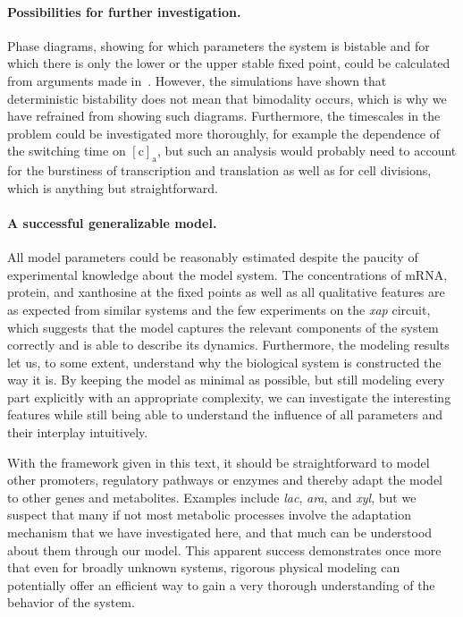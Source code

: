 \documentclass[10pt,letterpaper]{article}
\newcommand{\n}[1]{\mathrm{#1}}
\begin{document}
	\paragraph*{Possibilities for further investigation.}
	Phase diagrams, showing for which parameters the system is bistable and for
	which there is only the lower or the upper stable fixed point, could be
	calculated from arguments made in~\cite{Cherry2000}. However, the
	simulations have shown that deterministic bistability does not mean that
	bimodality occurs, which is why we have refrained from showing such
	diagrams. Furthermore, the timescales in the problem could be investigated
	more thoroughly, for example the dependence of the switching time on
	$\n{[c]_a}$, but such an analysis would probably need to
	account for the burstiness of transcription and translation as well as for
	cell divisions, which is anything but straightforward.
	
	\paragraph*{A successful generalizable model.}
	All model parameters could be reasonably estimated despite the paucity of
	experimental knowledge about the model system. The concentrations of mRNA, protein, and xanthosine at the fixed points as well as all qualitative features are as expected from similar systems and the few experiments on the \emph{xap} circuit, which suggests that the model captures the relevant components of the system correctly and is able to describe its
	dynamics. Furthermore, the modeling results let us, to some extent, understand why the biological system is constructed the way it is. By keeping the model as minimal as possible, but still modeling every part explicitly with an appropriate complexity, we can investigate the interesting features while still being able to understand the influence of all parameters and their interplay intuitively.
	
	With the framework given in this text, it
	should be straightforward to model other promoters, regulatory pathways or
	enzymes and thereby adapt the model to other genes and metabolites. Examples
	include \emph{lac}, \emph{ara}, and \emph{xyl}, but we suspect that many if
	not most metabolic processes involve the adaptation mechanism that we have
	investigated here, and that much can be understood about them through our
	model. This apparent success demonstrates once more that even for broadly
	unknown systems, rigorous physical modeling can potentially offer an
	efficient way to gain a very thorough understanding of the behavior of the
	system. 
	
\end{document}
